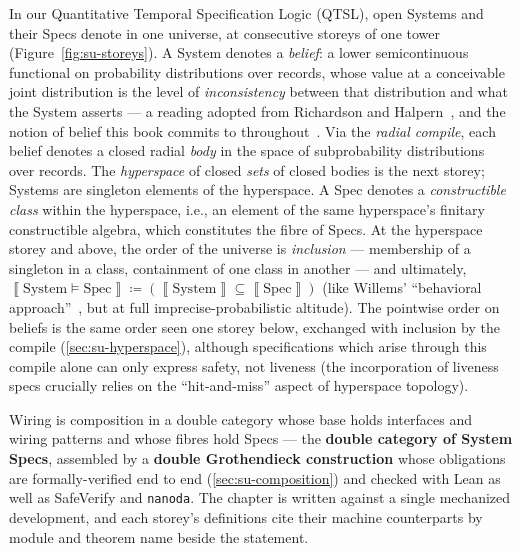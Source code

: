 In our Quantitative Temporal Specification Logic (QTSL), open Systems and their
Specs denote in one universe, at consecutive storeys of one tower
(Figure~\ref{fig:su-storeys}). A System denotes a \emph{belief}: a lower
semicontinuous functional on probability distributions over records, whose
value at a conceivable joint distribution is the level of \emph{inconsistency}
between that distribution and what the System asserts --- a reading adopted
from Richardson and Halpern~\cite{richardson20}, and the notion of belief this
book commits to throughout~\cite{dalrymple26imprecise}. Via the \emph{radial
compile}, each belief denotes a closed radial \emph{body} in the space of
subprobability distributions over records. The \emph{hyperspace} of closed \emph{sets} of
closed bodies is the next storey; Systems are singleton elements of the
hyperspace. A Spec denotes a \emph{constructible class} within the hyperspace,
i.e., an element of the same hyperspace's finitary constructible algebra, which
constitutes the fibre of Specs. At the hyperspace storey and above, the order
of the universe is \emph{inclusion} --- membership of a singleton in a class,
containment of one class in another --- and ultimately, $\left\llbracket
\mathrm{System} \vDash \mathrm{Spec} \right\rrbracket \coloneqq \left(
\left\llbracket \mathrm{System} \right\rrbracket \subseteq \left\llbracket
\mathrm{Spec} \right\rrbracket\right)$ (like Willems' ``behavioral
approach''~\cite{willems07}, but at full imprecise-probabilistic altitude). The
pointwise order on beliefs is the same order seen one storey below, exchanged
with inclusion by the compile (\autoref{sec:su-hyperspace}), although
specifications which arise through this compile alone can only express safety,
not liveness (the incorporation of liveness specs crucially relies on the
``hit-and-miss'' aspect of hyperspace topology).

Wiring is composition in a double category whose base holds interfaces and
wiring patterns and whose fibres hold Specs --- the \textbf{double category of
System Specs}, assembled by a \textbf{double Grothendieck construction} whose
obligations are formally-verified end to end (\autoref{sec:su-composition}) and
checked with Lean as well as SafeVerify and \texttt{nanoda}. The chapter is
written against a single mechanized development, and each storey's definitions
cite their machine counterparts by module and theorem name beside the
statement.

